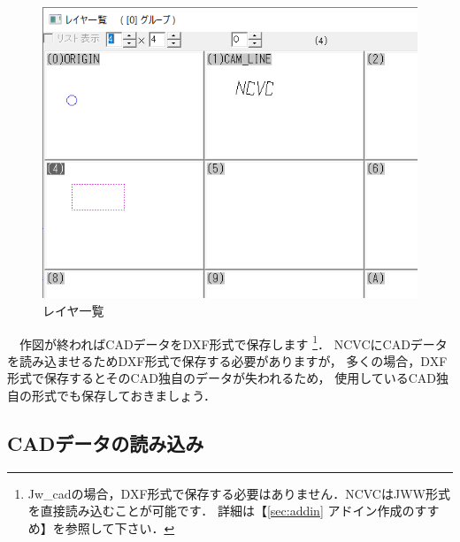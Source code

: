 \vspace*{1zh}
\begin{figure}[H]
\centering
\includegraphics{No2/fig/sampleLayer.png}
\caption{レイヤ一覧}
\label{fig:sampleLayer.png}
\end{figure}

　作図が終わればCADデータをDXF形式で保存します
\footnote{
    Jw\_cadの場合，DXF形式で保存する必要はありません．NCVCはJWW形式を直接読み込むことが可能です．
    詳細は【\ref{sec:addin} アドイン作成のすすめ】を参照して下さい．
}．
NCVCにCADデータを読み込ませるためDXF形式で保存する必要がありますが，
多くの場合，DXF形式で保存するとそのCAD独自のデータが失われるため，
使用しているCAD独自の形式でも保存しておきましょう．

\subsection{CADデータの読み込み}
\label{sec:ReadCAD}


